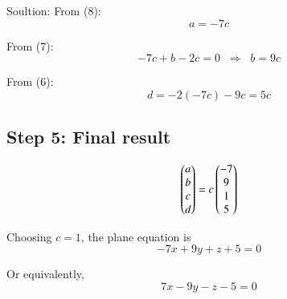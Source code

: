 \documentclass{beamer}
\begin{document}
\begin{frame}{Soultion:}
From (8):
\[
a = -7c \tag{9}
\]

From (7):
\[
-7c + b - 2c = 0 \;\;\Rightarrow\;\; b = 9c \tag{10}
\]

From (6):
\[
d = -2(-7c) - 9c = 5c \tag{11}
\]
\subsection*{Step 5: Final result}
\[
\begin{pmatrix}a\\ b\\ c\\ d\end{pmatrix} = c \begin{pmatrix}-7\\ 9\\ 1\\ 5\end{pmatrix}
\]

Choosing \(c=1\), the plane equation is
\[
-7x + 9y + z + 5 = 0 \tag{12}
\]

Or equivalently,
\[
\boxed{7x - 9y - z - 5 = 0 }\tag{13}
\]
\end{frame}
\end{document}
